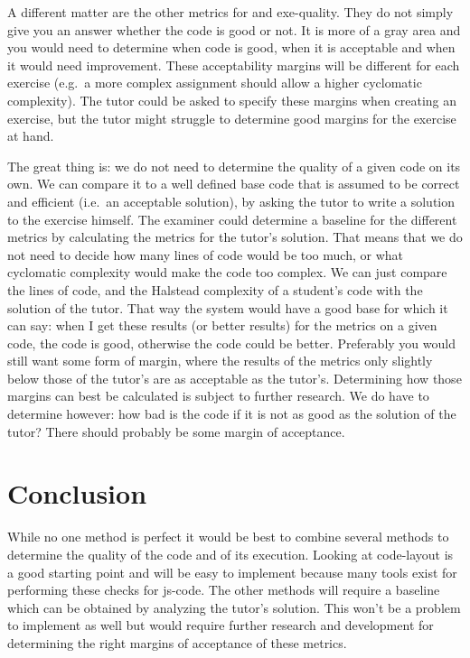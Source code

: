 A different matter are the other metrics
for  and \gls{exe-quality}.
They do not simply give you an answer whether the \gls{code} is good or not.
It is more of a gray area and you would need to determine
when \gls{code} is good, when it is acceptable
and when it would need improvement.
These acceptability margins will be different for each \gls{exercise}
(e.g.\ a more complex assignment should allow a higher cyclomatic complexity).
The \gls{tutor} could be asked to specify these margins
when creating an \gls{exercise},
but the \gls{tutor} might struggle to determine good margins
for the \gls{exercise} at hand.

The great thing is:
we do not need to determine the quality of a given \gls{code} on its own.
We can compare it to a well defined base \gls{code}
that is assumed to be correct and efficient (i.e.\ an acceptable solution),
by asking the \gls{tutor} to write a \gls{solution}
to the \gls{exercise} himself.
The \gls{examiner} could determine a baseline for the different metrics
by calculating the metrics for the \gls{tutor}'s \gls{solution}.
That means that we do not need to decide
how many lines of code would be too much,
or what cyclomatic complexity would make the \gls{code} too complex.
We can just compare the lines of code,
and the Halstead complexity of a \gls{student}'s \gls{code}
with the \gls{solution} of the \gls{tutor}.
That way the system would have a good base for which it can say:
when I get these results (or better results)
for the metrics on a given \gls{code}, the \gls{code} is good,
otherwise the \gls{code} could be better.
Preferably you would still want some form of margin,
where the results of the metrics only slightly below those of the \gls{tutor}'s
are as acceptable as the \gls{tutor}'s.
Determining how those margins can best be calculated
is subject to further research.
We do have to determine however: how bad is the \gls{code}
if it is not as good as the solution of the \gls{tutor}?
There should probably be some margin of acceptance.


\section{Conclusion}

While no one method is perfect it would be best to combine several methods
to determine the quality of the code and of its execution.
Looking at \gls{code-layout} is a good starting point
and will be easy to implement because many tools exist
for performing these checks for \gls{js-code}.
The other methods will require a baseline
which can be obtained by analyzing the \gls{tutor}'s \gls{solution}.
This won't be a problem to implement as well
but would require further research and development
for determining the right margins of acceptance of these metrics.

